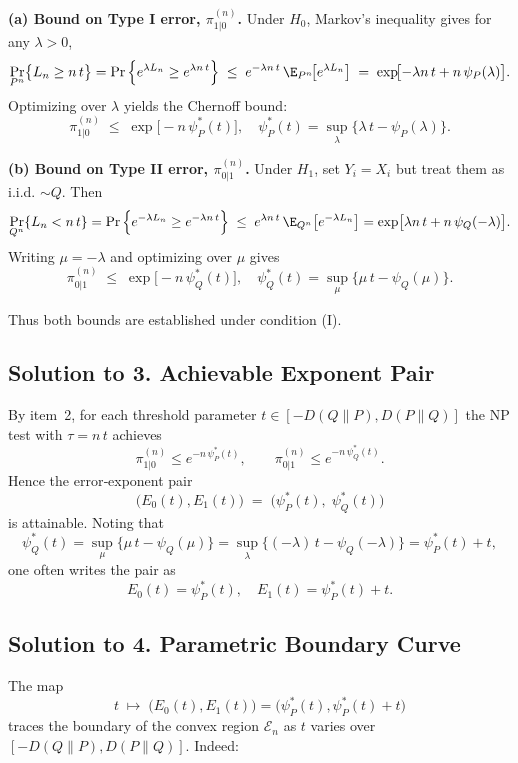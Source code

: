 \documentclass[11pt]{article}
\begin{document}
\medskip

\noindent\textbf{(a) Bound on Type I error, $\pi_{1|0}^{(n)}$.}  Under $H_0$, Markov’s inequality gives for any $\lambda>0$,
\[
\Pr_{P^n}\bigl\{L_n\ge n\,t\bigr\}
=\Pr\Big\{e^{\lambda L_n}\ge e^{\lambda n\,t}\Big\}
\;\le\; e^{-\lambda n\,t}\,\E_{P^n}\!\bigl[e^{\lambda L_n}\bigr]
\;=\;
\exp\!\bigl[-\lambda n\,t + n\,\psi_P(\lambda)\bigr].
\]
Optimizing over $\lambda$ yields the Chernoff bound:
\[
\pi_{1|0}^{(n)}\;\le\;\exp\bigl[-n\,\psi_P^*(t)\bigr],
\quad
\psi_P^*(t)=\sup_{\lambda}\{\lambda\,t-\psi_P(\lambda)\}.
\]

\medskip

\noindent\textbf{(b) Bound on Type II error, $\pi_{0|1}^{(n)}$.}  Under $H_1$, set $Y_i=X_i$ but treat them as i.i.d. $\sim Q$.  Then
\[
\Pr_{Q^n}\{L_n< n\,t\}
=\Pr\Big\{e^{-\lambda L_n}\ge e^{-\lambda n\,t}\Big\}
\;\le\;
e^{\lambda n\,t}\,\E_{Q^n}\bigl[e^{-\lambda L_n}\bigr]
=
\exp\bigl[\lambda n\,t + n\,\psi_Q(-\lambda)\bigr].
\]
Writing $\mu=-\lambda$ and optimizing over $\mu$ gives
\[
\pi_{0|1}^{(n)}
\;\le\;\exp\bigl[-n\,\psi_Q^*(t)\bigr],
\quad
\psi_Q^*(t)=\sup_{\mu}\{\mu\,t-\psi_Q(\mu)\}.
\]

Thus both bounds are established under condition (I).

\bigskip

\subsection*{Solution to 3. Achievable Exponent Pair}

By item 2, for each threshold parameter $t\in[-D(Q\!\parallel\!P),D(P\!\parallel\!Q)]$ the NP test with $\tau=n\,t$ achieves
\[
\pi_{1|0}^{(n)}\le e^{-n\,\psi_P^*(t)},\qquad
\pi_{0|1}^{(n)}\le e^{-n\,\psi_Q^*(t)}.
\]
Hence the error‐exponent pair
\[
\bigl(E_0(t),E_1(t)\bigr)
\;=\;\bigl(\psi_P^*(t),\;\psi_Q^*(t)\bigr)
\]
is attainable.  Noting that
\[
\psi_Q^*(t)
=\sup_{\mu}\{\mu\,t-\psi_Q(\mu)\}
=\sup_{\lambda}\{(-\lambda)\,t-\psi_Q(-\lambda)\}
=\psi_P^*(t)+t,
\]
one often writes the pair as
\[
E_0(t)=\psi_P^*(t),\quad
E_1(t)=\psi_P^*(t)+t.
\]

\bigskip

\subsection*{Solution to 4. Parametric Boundary Curve}

The map
\[
t\;\longmapsto\;\bigl(E_0(t),E_1(t)\bigr)
=\bigl(\psi_P^*(t),\psi_P^*(t)+t\bigr)
\]
traces the boundary of the convex region $\mathcal{E}_n$ as $t$ varies over $[-D(Q\!\|P),D(P\!\|Q)]$.  Indeed:
\end{document}
